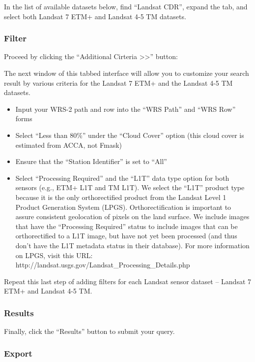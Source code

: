 \documentclass{article}
\begin{document}
In the list of available datasets below, find ``Landsat CDR'', expand
the tab, and select both Landsat 7 ETM+ and Landsat 4-5 TM datasets.

\subsubsection{Filter}

Proceed by clicking the ``Additional Cirteria
\textgreater{}\textgreater{}'' button:

The next window of this tabbed interface will allow you to customize
your search result by various criteria for the Landsat 7 ETM+ and the
Landsat 4-5 TM datasets.

\begin{itemize}
\itemsep1pt\parskip0pt
\item
  Input your WRS-2 path and row into the ``WRS Path'' and ``WRS Row''
  forms
\item
  Select ``Less than 80\%'' under the ``Cloud Cover'' option (this cloud
  cover is estimated from ACCA, not Fmask)
\item
  Ensure that the ``Station Identifier'' is set to ``All''
\item
  Select ``Processing Required'' and the ``L1T'' data type option for
  both sensors (e.g., ETM+ L1T and TM L1T). We select the ``L1T''
  product type because it is the only orthorectified product from the
  Landsat Level 1 Product Generation System (LPGS). Orthorectification
  is important to assure consistent geolocation of pixels on the land
  surface. We include images that have the ``Processing Required''
  status to include images that can be orthorectified to a L1T image,
  but have not yet been processed (and thus don't have the L1T metadata
  status in their database). For more information on LPGS, visit this
  URL: http://landsat.usgs.gov/Landsat\_Processing\_Details.php
\end{itemize}

Repeat this last step of adding filters for each Landsat sensor dataset
-- Landsat 7 ETM+ and Landsat 4-5 TM.

\subsubsection{Results}

Finally, click the ``Results'' button to submit your query.

\subsubsection{Export}
\end{document}

